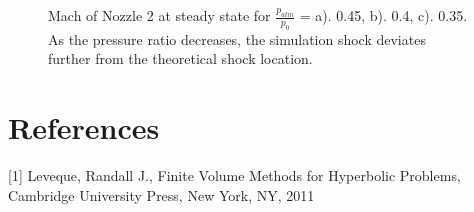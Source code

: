 \documentclass{article}%
\numberwithin{equation}{section}
\begin{document}
\begin{figure}[h!]
\centering
{}
\caption{Mach of Nozzle 2 at steady state for $\frac{p_{atm}}{p_0}$ = a). 0.45, b). 0.4, c). 0.35. As the pressure ratio decreases, the simulation shock deviates further from the theoretical shock location. \label{nozz2shock}}
\end{figure}

\pagebreak
\section*{References}
[1] Leveque, Randall J., Finite Volume Methods for Hyperbolic Problems, Cambridge University Press, New York, NY, 2011
\end{document}
